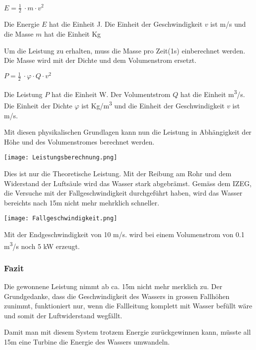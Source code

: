 \begin{center}
\(E =\frac 12\ \cdot m \cdot v^2\)
\end{center}

Die Energie \(E\) hat die Einheit \si{J}. Die Einheit der Geschwindigkeit \(v\) ist \si{m/s} und die Masse \(m\) hat die Einheit \si{Kg}

\newpage

Um die Leistung zu erhalten, muss die Masse pro Zeit(1s) einberechnet werden. Die Masse wird  mit der Dichte und dem Volumenstrom ersetzt.

\begin{center}
\(P =\frac 12\ \cdot \varphi \cdot Q \cdot v^2\)
\end{center}

Die Leistung \(P\) hat die Einheit \si{W}. Der Volumentstrom \(Q\) hat die Einheit \si{m^3/s}. Die Einheit der Dichte \(\varphi\) ist \si{Kg/m^3} und die Einheit der Geschwindigkeit \(v\) ist \si{m/s}.
\newline 
\newline
 \newline


Mit diesen physikalischen Grundlagen kann nun die Leistung in Abhängigkeit der Höhe und des Volumenstromes berechnet werden. 

\begin{center}
\texttt{[image: Leistungsberechnung.png]}
\end{center}

Dies ist nur die Theoretische Leistung. Mit der Reibung am Rohr und dem Widerstand der Luftsäule wird das Wasser stark abgebrämst. Gemäss dem IZEG, die Versuche mit der Fallgeschwindigkeit durchgeführt haben, wird das Wasser bereichts nach 15m nicht mehr mehrklich schneller.

\begin{center}
\texttt{[image: Fallgeschwindigkeit.png]}
\end{center}

Mit der Endgeschwindigkeit von 10 \si{m/s}. wird bei einem Volumenstrom von 0.1 \si{m^3/s} noch 5 \si{kW} erzeugt.

\subsubsection{Fazit}

Die gewonnene Leistung nimmt ab ca. 15m nicht mehr merklich zu. Der Grundgedanke, dass die Geschwindigkeit des Wassers in grossen Fallhöhen zunimmt, funktioniert nur, wenn die Fallleitung komplett mit Wasser befüllt wäre und somit der Luftwiderstand wegfällt.

Damit man mit diesem System trotzem Energie zurückgewinnen kann, müsste all 15m eine Turbine die Energie des Wassers umwandeln.

\clearpage 





